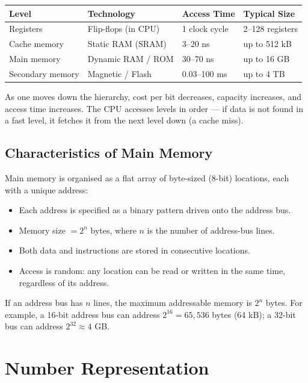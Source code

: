 \documentclass[11pt, a4paper, notitlepage]{report}
\theoremstyle{definition}
\theoremstyle{remark}
\theoremstyle{definition}
\begin{document}
\begin{center}
\begin{tabular}{llll}
\toprule
\textbf{Level} & \textbf{Technology} & \textbf{Access Time} & \textbf{Typical Size} \\
\midrule
Registers & Flip-flops (in CPU) & 1 clock cycle & 2--128 registers \\
Cache memory & Static RAM (SRAM) & 3--20 ns & up to 512 kB \\
Main memory & Dynamic RAM / ROM & 30--70 ns & up to 16 GB \\
Secondary memory & Magnetic / Flash & 0.03--100 ms & up to 4 TB \\
\bottomrule
\end{tabular}
\end{center}

As one moves down the hierarchy, cost per bit decreases, capacity increases, and access time increases. The CPU accesses levels in order --- if data is not found in a fast level, it fetches it from the next level down (a cache miss).

\subsection{Characteristics of Main Memory}

Main memory is organised as a flat array of byte-sized (8-bit) locations, each with a unique address:

\begin{itemize}
  \item Each address is specified as a binary pattern driven onto the address bus.
  \item Memory size $= 2^n$ bytes, where $n$ is the number of address-bus lines.
  \item Both data and instructions are stored in consecutive locations.
  \item Access is random: any location can be read or written in the same time, regardless of its address.
\end{itemize}

\begin{examtip}[title={Memory Size Formula}]
If an address bus has $n$ lines, the maximum addressable memory is $2^n$ bytes. For example, a 16-bit address bus can address $2^{16} = 65{,}536$ bytes (64 kB); a 32-bit bus can address $2^{32} \approx 4$ GB\@.
\end{examtip}

\section{Number Representation}
\end{document}
